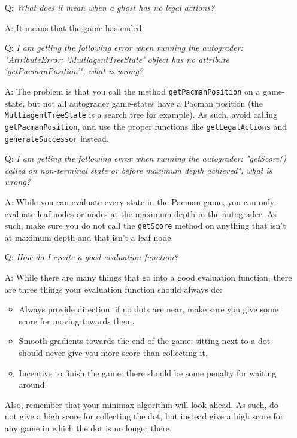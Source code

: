 \documentclass{article}
\begin{document}
\begin{itemize}
\item[Q:] \emph{What does it mean when a ghost has no legal actions?}
\item[A:] It means that the game has ended.
\item[]

\item[Q:] \emph{I am getting the following error when running the autograder: "AttributeError: `MultiagentTreeState' object has no attribute `getPacmanPosition'", what is wrong?}
\item[A:] The problem is that you call the method \texttt{getPacmanPosition} on a game-state, but not all autograder game-states have a Pacman position (the \texttt{MultiagentTreeState} is a search tree for example). As such, avoid calling \texttt{getPacmanPosition}, and use the proper functions like \texttt{getLegalActions} and \texttt{generateSuccessor} instead.
\item[]



\item[Q:] \emph{I am getting the following error when running the autograder: "getScore() called on non-terminal state or before maximum depth achieved", what is wrong?}
\item[A:] While you can evaluate every state in the Pacman game, you can only evaluate leaf nodes or nodes at the maximum depth in the autograder. As such, make sure you do not call the \texttt{getScore} method on anything that isn't at maximum depth and that isn't a leaf node.
\item[]

\item[Q:] \emph{How do I create a good evaluation function?}
\item[A:] While there are many things that go into a good evaluation function, there are three things your evaluation function should always do:
\begin{itemize}
\item Always provide direction: if no dots are near, make sure you give some score for moving towards them.
\item Smooth gradients towards the end of the game: sitting next to a dot should never give you more score than collecting it. 
\item Incentive to finish the game: there should be some penalty for waiting around.
\end{itemize}

Also, remember that your minimax algorithm will look ahead. As such, do not give a high score for collecting the dot, but instead give a high score for any game in which the dot is no longer there.
\item[]
\end{itemize}
\end{document}
